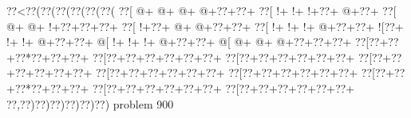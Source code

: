 \vbox{\vbox{\goo
\0??<\0??(\0??(\0??(\0??(\0??(\0??(
\0??[\- @+\- @+\- @+\- @+\0??+\0??+
\0??[\- !+\- !+\- !+\0??+\- @+\0??+
\0??[\- @+\- @+\- !+\0??+\0??+\0??+
\0??[\- !+\0??+\- @+\- @+\0??+\0??+
\0??[\- !+\- !+\- !+\- @+\0??+\0??+
\- ![\0??+\- !+\- !+\- @+\0??+\0??+
\- @[\- !+\- !+\- !+\- @+\0??+\0??+
\- @[\- @+\- @+\- @+\0??+\0??+\0??+
\0??[\0??+\0??+\0??*\0??+\0??+\0??+
\0??[\0??+\0??+\0??+\0??+\0??+\0??+
\0??[\0??+\0??+\0??+\0??+\0??+\0??+
\0??[\0??+\0??+\0??+\0??+\0??+\0??+
\0??[\0??+\0??+\0??+\0??+\0??+\0??+
\0??[\0??+\0??+\0??+\0??+\0??+\0??+
\0??[\0??+\0??+\0??*\0??+\0??+\0??+
\0??[\0??+\0??+\0??+\0??+\0??+\0??+
\0??[\0??+\0??+\0??+\0??+\0??+\0??+
\0??,\0??)\0??)\0??)\0??)\0??)\0??)
}
\hfil problem 900\hfil\break
}
